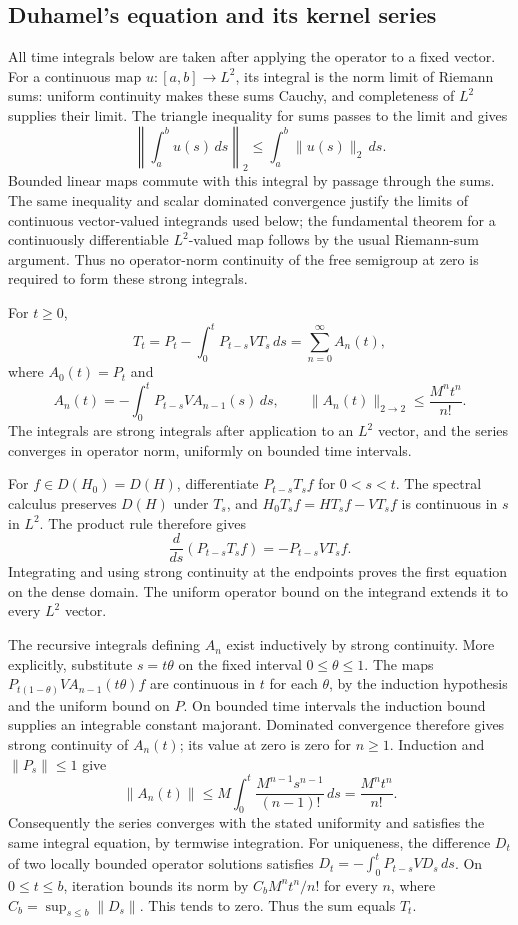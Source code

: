 \subsection{Duhamel's equation and its kernel series}
All time integrals below are taken after applying the operator to a
fixed vector. For a continuous map $u:[a,b]\to L^2$, its integral is
the norm limit of Riemann sums: uniform continuity makes these sums
Cauchy, and completeness of $L^2$ supplies their limit. The triangle
inequality for sums passes to the limit and gives
\[
\left\|\int_a^b u(s)\,ds\right\|_2
 \leq\int_a^b\|u(s)\|_2\,ds.
\]
Bounded linear maps commute with this integral by passage through the
sums. The same inequality and scalar dominated convergence justify
the limits of continuous vector-valued integrands used below; the
fundamental theorem for a continuously differentiable $L^2$-valued
map follows by the usual Riemann-sum argument. Thus no operator-norm
continuity of the free semigroup at zero is required to form these
strong integrals.

\begin{lemma}
\label{lem:schrodinger_duhamel}
For $t\geq0$,
\[
T_t=P_t-\int_0^t P_{t-s}VT_s\,ds
     =\sum_{n=0}^{\infty}A_n(t),
\]
where $A_0(t)=P_t$ and
\[
A_n(t)=-\int_0^t P_{t-s}V A_{n-1}(s)\,ds,\qquad
\|A_n(t)\|_{2\to2}\leq\frac{M^nt^n}{n!}.
\]
The integrals are strong integrals after application to an $L^2$
vector, and the series converges in operator norm, uniformly on bounded
time intervals.
\end{lemma}
\Proof
For $f\in D(H_0)=D(H)$, differentiate $P_{t-s}T_sf$ for $0<s<t$.
The spectral calculus preserves $D(H)$ under $T_s$, and
$H_0T_sf=HT_sf-VT_sf$ is continuous in $s$ in $L^2$. The product rule
therefore gives
\[
\frac{d}{ds}(P_{t-s}T_sf)=-P_{t-s}VT_sf.
\]
Integrating and using strong continuity at the endpoints proves the
first equation on the dense domain. The uniform operator bound on the
integrand extends it to every $L^2$ vector.

The recursive integrals defining $A_n$ exist inductively by strong
continuity. More explicitly, substitute $s=t\theta$ on the fixed
interval $0\leq\theta\leq1$. The maps
$P_{t(1-\theta)}VA_{n-1}(t\theta)f$ are continuous in $t$ for each
$\theta$, by the induction hypothesis and the uniform bound on $P$.
On bounded time intervals the induction bound supplies an integrable
constant majorant. Dominated convergence therefore gives strong
continuity of $A_n(t)$; its value at zero is zero for $n\geq1$.
Induction and $\|P_s\|\leq1$ give
\[
\|A_n(t)\|\leq M\int_0^t\frac{M^{n-1}s^{n-1}}{(n-1)!}\,ds
 =\frac{M^nt^n}{n!}.
\]
Consequently the series converges with the stated uniformity and
satisfies the same integral equation, by termwise integration.
For uniqueness, the difference $D_t$ of two locally bounded operator
solutions satisfies $D_t=-\int_0^tP_{t-s}VD_s\,ds$.
On $0\leq t\leq b$, iteration bounds its norm by
$C_b M^nt^n/n!$ for every $n$, where $C_b=\sup_{s\leq b}\|D_s\|$.
This tends to zero. Thus the sum equals $T_t$.
\Done

